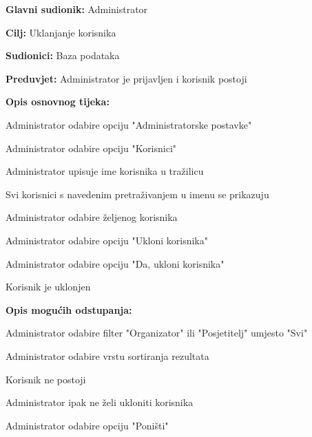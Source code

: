 					\noindent {}
					\begin{packed_item}
	
						\item \textbf{Glavni sudionik:} Administrator
						\item  \textbf{Cilj:} Uklanjanje korisnika
						\item  \textbf{Sudionici:} Baza podataka
						\item  \textbf{Preduvjet:} Administrator je prijavljen i korisnik postoji
						\item  \textbf{Opis osnovnog tijeka:}
						
						\item[] \begin{packed_enum}
	
							\item Administrator odabire opciju "Administratorske postavke"
							\item Administrator odabire opciju "Korisnici"
							\item Administrator upisuje ime korisnika u tražilicu
							\item Svi korisnici s navedenim pretraživanjem u imenu se prikazuju
							\item Administrator odabire željenog korisnika
							\item Administrator odabire opciju "Ukloni korisnika"
							\item Administrator odabire opciju "Da, ukloni korisnika"
							\item Korisnik je uklonjen
						\end{packed_enum}
						
						\item  \textbf{Opis mogućih odstupanja:}
						
						\item[] \begin{packed_item}
						
							\item[3.a] Administrator odabire filter "Organizator" ili "Posjetitelj" umjesto "Svi"
							\item[3.b] Administrator odabire vrstu sortiranja rezultata
							\item[4.a] Korisnik ne postoji
							\item[7.a] Administrator ipak ne želi ukloniti korisnika
							\item[] \begin{packed_enum}
								
								\item Administrator odabire opciju "Poništi"
								
							\end{packed_enum}
						\end{packed_item}
					\end{packed_item}

